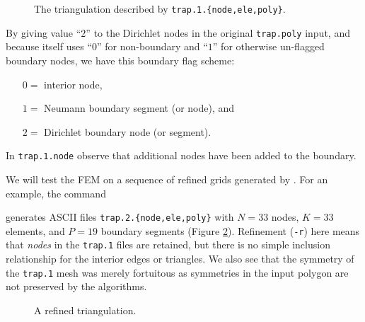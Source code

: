 \begin{figure}

\caption{The triangulation described by \texttt{trap.1.\{node,ele,poly\}}.}
\label{fig:un:trapone}
\end{figure}


By giving value ``$2$'' to the Dirichlet nodes in the original \texttt{trap.poly} input, and because \Triangle itself uses ``$0$'' for non-boundary and ``$1$'' for otherwise un-flagged boundary nodes, we have this boundary flag scheme:
\begin{itemize}
\item[$0=$] interior node,
\item[$1=$] Neumann boundary segment (or node), and
\item[$2=$] Dirichlet boundary node (or segment).
\end{itemize}
In \texttt{trap.1.node} observe that additional nodes have been added to the boundary.


We will test the FEM on a sequence of refined grids generated by \Triangle.  For an example, the command
generates ASCII files \texttt{trap.2.\{node,ele,poly\}} with $N=33$ nodes, $K=33$ elements, and $P=19$ boundary segments (Figure \ref{fig:un:traptwo}).  Refinement (\texttt{-r}) here means that \emph{nodes} in the \texttt{trap.1} files are retained, but there is no simple inclusion relationship for the interior edges or triangles.  We also see that the symmetry of the \texttt{trap.1} mesh was merely fortuitous as symmetries in the input polygon are not preserved by the \Triangle algorithms.


\begin{figure}

\caption{A refined triangulation.}
\label{fig:un:traptwo}
\end{figure}

